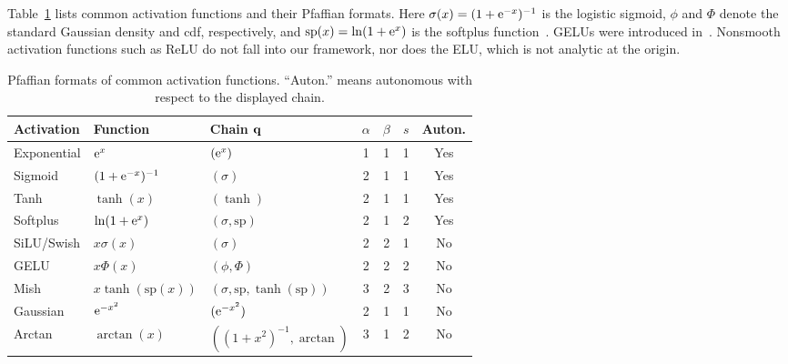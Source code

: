\begin{example}\label{ex:activations}
Table~\ref{tab:activations} lists common activation functions and their Pfaffian formats. Here $\sigma(x)=(1+\mathrm{e}^{-x})^{-1}$ is the logistic sigmoid, $\phi$ and $\Phi$ denote the standard Gaussian density and cdf, respectively, and $\mathrm{sp}(x)=\ln(1+\mathrm{e}^x)$ is the softplus function~\cite{glorot2011deep}. GELUs were introduced in~\cite{hendrycks2016gaussian}. Nonsmooth activation functions such as ReLU do not fall into our framework, nor does the ELU, which is not analytic at the origin.

\begin{table}[htbp]
  \centering
  \begin{tabular}{lllcccc}
    \toprule
    Activation & Function & Chain $\mathbf{q}$ & $\alpha$ & $\beta$ & $s$ & Auton.\\
    \midrule
    Exponential & $\mathrm{e}^x$ & $(\mathrm{e}^x)$ & 1 & 1 & 1 & Yes \\
    Sigmoid & $(1+\mathrm{e}^{-x})^{-1}$ & $(\sigma)$ & 2 & 1 & 1 & Yes \\
    Tanh & $\tanh(x)$ & $(\tanh)$ & 2 & 1 & 1 & Yes \\
    Softplus & $\ln(1+\mathrm{e}^x)$ & $(\sigma,\mathrm{sp})$ & 2 & 1 & 2 & Yes \\
    SiLU/Swish & $x\sigma(x)$ & $(\sigma)$ & 2 & 2 & 1 & No \\
    GELU & $x\Phi(x)$ & $(\phi,\Phi)$ & 2 & 2 & 2 & No \\
    Mish & $x\tanh(\mathrm{sp}(x))$ & $(\sigma,\mathrm{sp},\tanh(\mathrm{sp}))$ & 3 & 2 & 3 & No \\
    Gaussian & $\mathrm{e}^{-x^2}$ & $(\mathrm{e}^{-x^2})$ & 2 & 1 & 1 & No \\
    Arctan & $\arctan(x)$ & $((1+x^2)^{-1},\arctan)$ & 3 & 1 & 2 & No \\
    \bottomrule
  \end{tabular}
  \caption{Pfaffian formats of common activation functions. ``Auton.'' means autonomous with respect to the displayed chain.}
  \label{tab:activations}
\end{table}
\end{example}

